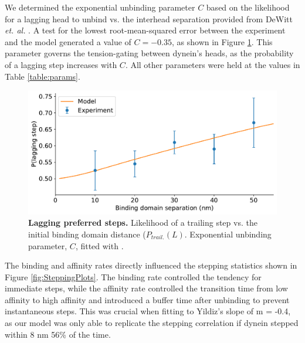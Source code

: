 \documentclass[9pt,twocolumn,twoside]{article}
\begin{document}
%
We determined the exponential unbinding parameter $C$ based on the likelihood for a lagging head to unbind vs. the interhead separation provided from DeWitt \textit{et. al.} \cite{dewitt}. A test for the lowest root-mean-squared error between the experiment and the model generated a value of $C=-0.35$, as shown in Figure \ref{fig:ProbLagPlot}. This parameter governs the tension-gating between dynein's heads, as the probability of a lagging step increases with $C$. All other parameters were held at the values in Table \ref{table:params}.

\begin{figure}[tbhp]
	\centering
	\includegraphics[width=\linewidth]{../../plots/mc_plots/prob_lagging_vs_init_L_-0.35}
	\caption[Lagging preferred steps]{\textbf{Lagging preferred steps.} Likelihood of a trailing step vs. the initial binding domain distance ($P_{trail.}(L)$. Exponential unbinding parameter, $C$, fitted with \cite{Dewitt2012}.}
	\label{fig:ProbLagPlot}
\end{figure}


The binding and affinity rates directly influenced the stepping statistics shown in Figure \ref{fig:SteppingPlots}. The binding rate controlled the tendency for immediate steps, while the affinity rate controlled the transition time from low affinity to high affinity and introduced a buffer time after unbinding to prevent instantaneous steps. This was crucial when fitting to Yildiz's slope of m = -0.4, as our model was only able to replicate the stepping correlation if dynein stepped within 8 nm 56\% of the time.  
\end{document}
